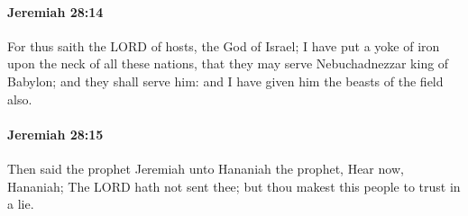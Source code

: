 		\paragraph{Jeremiah 28:14} %
			\label{JEREMIAH-28-14}

			For thus saith the LORD of hosts, the God of Israel; I have put a yoke of iron upon the neck of all these nations, that they may serve Nebuchadnezzar king of Babylon; and they shall serve him: and I have given him the beasts of the field also.


		\paragraph{Jeremiah 28:15} %
			\label{JEREMIAH-28-15}

			Then said the prophet Jeremiah unto Hananiah the prophet, Hear now, Hananiah; The LORD hath not sent thee; but thou makest this people to trust in a lie.

